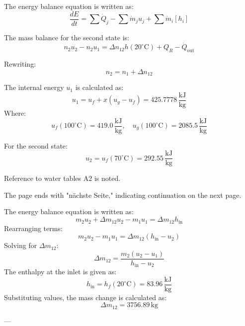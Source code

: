 The energy balance equation is written as:  
\[
\frac{dE}{dt} = \sum \dot{Q}_j - \sum \dot{m}_j u_j + \sum \dot{m}_i \left[ h_i \right]
\]  

The mass balance for the second state is:  
\[
n_2 u_2 - n_2 u_1 = \Delta n_{12} h(20^\circ \text{C}) + Q_R - \dot{Q}_{\text{out}}
\]  

Rewriting:  
\[
n_2 = n_1 + \Delta n_{12}
\]  

The internal energy \( u_1 \) is calculated as:  
\[
u_1 = u_{f} + x \left( u_{g} - u_{f} \right) = 425.7778 \, \frac{\text{kJ}}{\text{kg}}
\]  
Where:  
\[
u_f(100^\circ \text{C}) = 419.0 \, \frac{\text{kJ}}{\text{kg}}, \quad u_g(100^\circ \text{C}) = 2085.5 \, \frac{\text{kJ}}{\text{kg}}
\]  

For the second state:  
\[
u_2 = u_f(70^\circ \text{C}) = 292.55 \, \frac{\text{kJ}}{\text{kg}}
\]  

Reference to water tables \( \text{A2} \) is noted.  

The page ends with "nächste Seite," indicating continuation on the next page.

The energy balance equation is written as:  
\[
m_2 u_2 + \Delta m_{12} u_2 - m_1 u_1 = \Delta m_{12} h_{\text{in}}
\]  
Rearranging terms:  
\[
m_2 u_2 - m_1 u_1 = \Delta m_{12} (h_{\text{in}} - u_2)
\]  
Solving for \( \Delta m_{12} \):  
\[
\Delta m_{12} = \frac{m_2 (u_2 - u_1)}{h_{\text{in}} - u_2}
\]  
The enthalpy at the inlet is given as:  
\[
h_{\text{in}} = h_f(20^\circ\text{C}) = 83.96 \, \frac{\text{kJ}}{\text{kg}}
\]  
Substituting values, the mass change is calculated as:  
\[
\Delta m_{12} = 3756.89 \, \text{kg}
\]  

---
